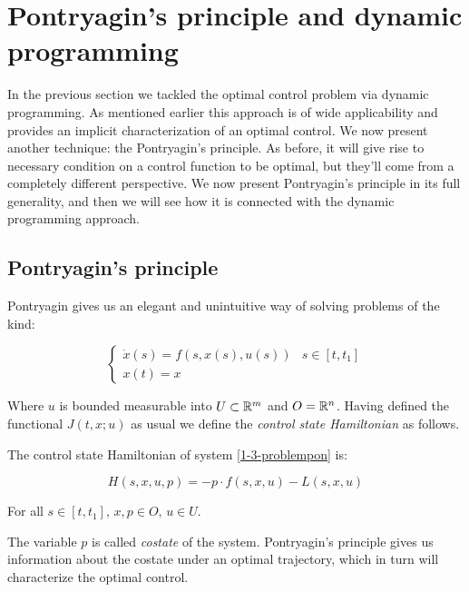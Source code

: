 \section{Pontryagin's principle and dynamic programming}\label{Section: Pontryagin Principle}

In the previous section we tackled the optimal control problem via dynamic programming.
As mentioned earlier this approach is of wide applicability and provides an implicit 
characterization of an optimal control. We now present another technique: the Pontryagin's principle.
As before, it will give rise to necessary condition on a control function 
to be optimal, but they'll come from a completely different perspective. We now present Pontryagin's 
principle in its full generality, and then we will see how it is connected with 
the dynamic programming approach. 

\subsection{Pontryagin's principle}

Pontryagin gives us an elegant and unintuitive way of solving problems of the kind:

\begin{equation}\label{1-3-problempon}
    \begin{cases}
        \dot{x}(s) = f(s,x(s),u(s)) & s\in [t,t_1] \\
        x(t) = x
    \end{cases}
\end{equation}

Where $u$ is bounded measurable into $U\subset\mathbb{R}^m$ and $O=\mathbb{R}^n$. Having defined the 
functional $J(t,x;u)$ as usual we define the \textit{control state Hamiltonian} 
as follows.

\begin{definition}
    The control state Hamiltonian of system \ref{1-3-problempon} is:

    \begin{equation}\label{1-3-hamiltonian}
        H(s,x,u,p) = - p \cdot f(s,x,u) - L(s,x,u)
    \end{equation}

    For all $s\in[t,t_1],\,x,p\in O,\,u\in U$.
\end{definition}

The variable $p$ is called \textit{costate} of the system. Pontryagin's principle 
gives us information about the costate under an optimal trajectory, which in turn will 
characterize the optimal control. 

